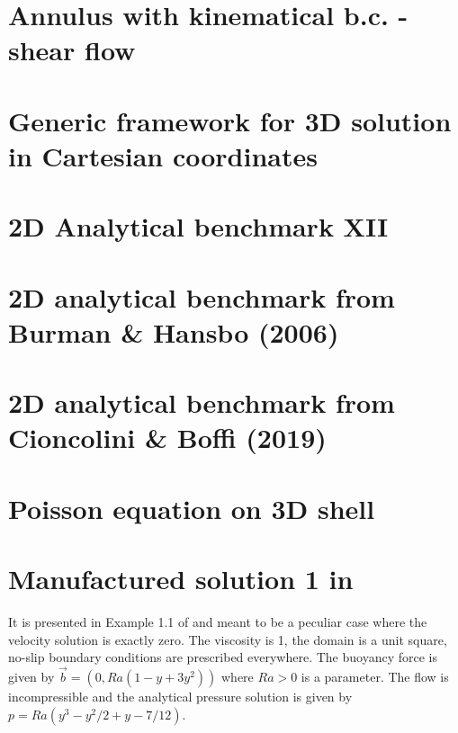 \section{Annulus with kinematical b.c. - shear flow}\label{ss:sfan}


\section{Generic framework for 3D solution in Cartesian coordinates}\label{ss:mms3Dgen}


\section{2D Analytical benchmark XII}\label{ss:sofo87_2D}


\section{2D analytical benchmark from Burman \& Hansbo (2006)}\label{ss:mms_buha06}


\section{2D analytical benchmark from Cioncolini \& Boffi (2019) \label{ss:mms_cibo19}}


\section{Poisson equation on 3D shell}
 

\section{Manufactured solution 1 in \textcite{jolm17}  \label{ss:mms_jolm17a}}

It is presented in Example 1.1 of \cite{jolm17} and meant to be a peculiar case where the velocity solution 
is exactly zero. The viscosity is 1, the domain is a unit square, no-slip boundary conditions 
are prescribed everywhere. The buoyancy force is given by $\vec{b}=(0,Ra(1-y+3y^2))$ where 
$Ra>0$ is a parameter. The flow is incompressible and the analytical pressure solution 
is given by $p=Ra(y^3-y^2/2+y-7/12)$.

